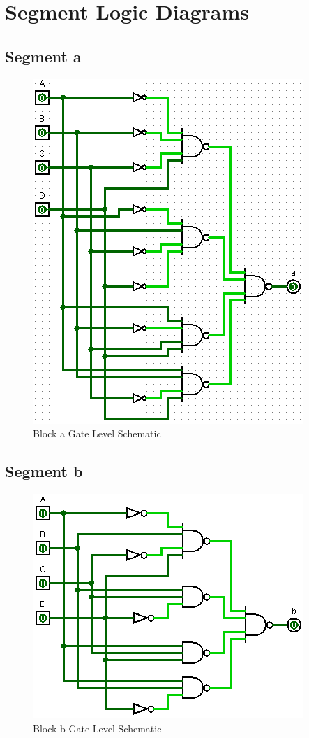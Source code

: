 \documentclass[12pt]{article}
\begin{document}
\newpage
\appendix
\section{Segment Logic Diagrams}
\label{app:segmentLogic}
\subsection{Segment a}

\begin{figure}[H]
	\centering
	\label{fig:aBlockGates}
	\includegraphics[width=0.5\linewidth, keepaspectratio]{a_logicCkt}
	\caption{Block a Gate Level Schematic}
\end{figure}

\subsection{Segment b}

\begin{figure}[H]
	\centering
	\label{fig:bBlockGates}
	\includegraphics[width=0.5\linewidth, keepaspectratio]{b_logicCkt}
	\caption{Block b Gate Level Schematic}
\end{figure}
\end{document}
